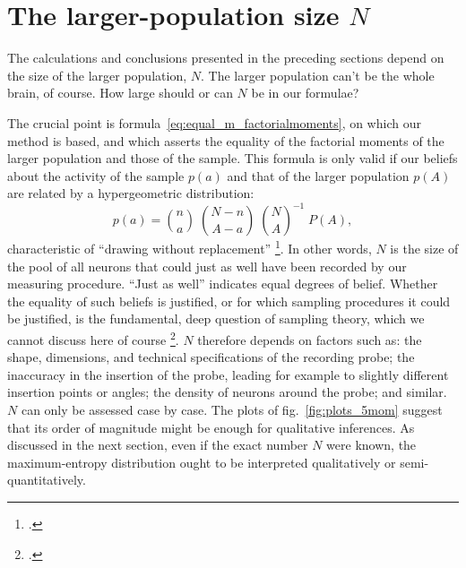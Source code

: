\documentclass[\ifafour a4paper,12pt,\else a5paper,10pt,\fi%
onecolumn,oneside,article,%
british%
]{memoir}
\theoremstyle{remark}
\theoremstyle{innote}
\newcommand*{\citep}{\footcites}
\renewcommand*{\|}{\nonscript\,\vert\nonscript\;\mathopen{}}
\newcommand*{\sect}{\S}%
\newcommand*{\chap}{ch.}%
\newcommand*{\fig}{fig.}%
\newcommand*{\eg}{{e.g.}}
\newcommand*{\yAv}{A}
\newcommand*{\yav}{a}
\newcommand*{\ya}{\yav}%
\newcommand*{\yA}{\yAv}%
\newcommand*{\pxx}{p}
\newcommand*{\pxxx}{P}
\begin{document}
\section{The larger-population size $N$}
\label{sec:N}

%
% 

The calculations and conclusions presented in the preceding sections depend
on the size of the larger population, $N$. The larger population can't be the whole
brain, of course. How large should or can $N$ be in our formulae?

The crucial point is formula~\eqref{eq:equal_m_factorialmoments}, on which
our method is based, and which asserts the equality of the factorial
moments of the larger population and those of the sample. This formula is only
valid if our beliefs about the activity of the sample $\pxx(\ya)$ and that
of the larger population $\pxx(\yA)$ are related by a hypergeometric
distribution:
\begin{equation}
  \label{eq:hypergeometric_relation}
    \pxx(\ya)=
  \binom{n}{\ya}\;\binom{N-n}{\yA-\ya}\;\binom{N}{\yA}^{-1}
\;\pxxx(\yA),
\end{equation}
characteristic of \enquote{drawing without replacement}
\citep[\chap~3]{jaynes1994_r2003}[\sect~4.8.3]{ross1976_r2010}[\sect~II.6]{feller1950_r1968}.
In other words, $N$ is the size of the pool of all neurons that could just
as well have been recorded by our measuring procedure. \enquote{Just as
  well} indicates equal degrees of belief. Whether the equality of such
beliefs is justified, or for which sampling procedures it could be
justified, is the fundamental, deep question of sampling theory, which we
cannot discuss here of course \citep[see \eg\ the discussions, reviews, and
references in][]{ericson1969,smith1976}. $N$ therefore depends on factors
such as: the shape, dimensions, and technical specifications of the
recording probe; the inaccuracy in the insertion of the probe, leading for
example to slightly different insertion points or angles; the density of
neurons around the probe; and similar. $N$ can only be assessed case by
case. The plots of \fig~\ref{fig:plots_5mom} suggest that its order of
magnitude might be enough for qualitative inferences. As discussed in the
next section, even if the exact number $N$ were known, the maximum-entropy
distribution ought to be interpreted qualitatively or semi-quantitatively.
\end{document}
